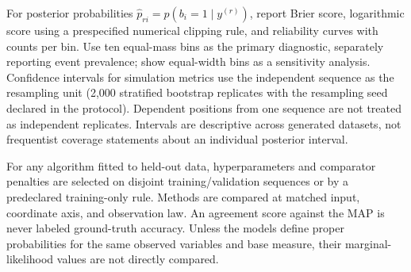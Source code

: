 For posterior probabilities $\widehat p_{ri}=p(b_i=1\mid y^{(r)})$, report
Brier score, logarithmic score using a prespecified numerical clipping rule,
and reliability curves with counts per bin. Use ten equal-mass bins as the
primary diagnostic, separately reporting event prevalence; show equal-width
bins as a sensitivity analysis. Confidence intervals for simulation metrics
use the independent sequence as the resampling unit (2,000 stratified
bootstrap replicates with the resampling seed declared in the protocol).
Dependent positions from one sequence are not treated as independent
replicates. Intervals are descriptive across generated datasets, not
frequentist coverage statements about an individual posterior interval.

For any algorithm fitted to held-out data, hyperparameters and comparator
penalties are selected on disjoint training/validation sequences or by a
predeclared training-only rule. Methods are compared at matched input,
coordinate axis, and observation law. An agreement score against the
\BayesBreak MAP is never labeled ground-truth accuracy. Unless the models
define proper probabilities for the same observed variables and base measure,
their marginal-likelihood values are not directly compared.

